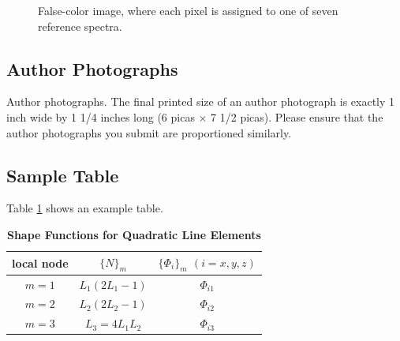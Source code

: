 \documentclass[9pt,twocolumn,twoside]{osajnl}
\begin{document}
\begin{figure}[htbp]
\centering
{}
\caption{False-color image, where each pixel is assigned to one of seven reference spectra.}
\label{fig:falsecolor}
\end{figure}

\subsection{Author Photographs}
Author photographs. The final printed size of an author photograph is exactly 1 inch wide by 1 1/4 inches long (6 picas × 7 1/2 picas). Please ensure that the author photographs you submit are proportioned similarly.

\subsection{Sample Table}

Table \ref{tab:shapefunctions} shows an example table.

\begin{table}[htbp]
\centering
\caption{\bf Shape Functions for Quadratic Line Elements}
\begin{tabular}{ccc}
\hline
local node & $\{N\}_m$ & $\{\Phi_i\}_m$ $(i=x,y,z)$ \\
\hline
$m = 1$ & $L_1(2L_1-1)$ & $\Phi_{i1}$ \\
$m = 2$ & $L_2(2L_2-1)$ & $\Phi_{i2}$ \\
$m = 3$ & $L_3=4L_1L_2$ & $\Phi_{i3}$ \\
\hline
\end{tabular}
  \label{tab:shapefunctions}
\end{table}
\end{document}
